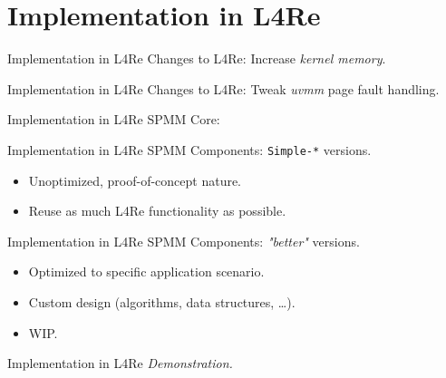 \section{Implementation in L4Re}
\label{sec:implementation}

\begin{frame}[t,fragile]{Implementation in L4Re}
  \pause
  Changes to L4Re: Increase \emph{kernel memory}.
  \vspace*{0.25cm}
  
\end{frame}

\begin{frame}[t,fragile]{Implementation in L4Re}
  Changes to L4Re: Tweak \emph{uvmm} page fault handling.
  \vspace*{0.25cm}
  
\end{frame}

\begin{frame}[t]{Implementation in L4Re}
  SPMM Core:
  \vspace*{0.5cm}
  \begin{figure}
    \centering
    
  \end{figure}
\end{frame}

\begin{frame}{Implementation in L4Re}
  SPMM Components:
  \pause
  \texttt{Simple-*} versions.
  \begin{itemize}
    \item Unoptimized, proof-of-concept nature.
    \item Reuse as much L4Re functionality as possible.
  \end{itemize}
\end{frame}

\begin{frame}{Implementation in L4Re}
  SPMM Components: \emph{"better"} versions.
  \begin{itemize}
    \item Optimized to specific application scenario.
    \item Custom design (algorithms, data structures, \ldots).
    \item \textlangle{}WIP\textrangle{}.
  \end{itemize}
\end{frame}

\begin{frame}{Implementation in L4Re}
  \centering
  \emph{Demonstration.}
\end{frame}
